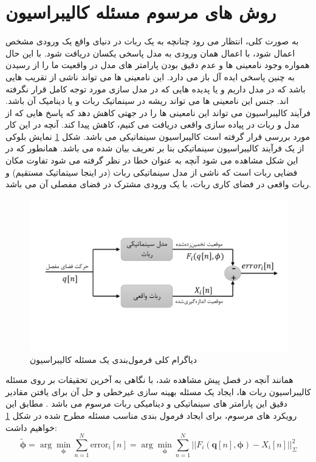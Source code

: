 \section{روش های مرسوم مسئله کالیبراسیون} \label{seq:conventional_calibration}
به صورت کلی، انتظار می رود چنانچه به یک ربات در دنیای واقع یک ورودی مشخص اعمال شود، با اعمال همان ورودی به مدل پاسخی یکسان دریافت شود. با این حال همواره وجود نامعینی ها و عدم دقیق بودن پارامتر های مدل در واقعیت ما را از رسیدن به چنین پاسخی ایده آل باز می دارد. این نامعینی ها می تواند ناشی از تقریب هایی باشد که در مدل داریم و یا پدیده هایی که در مدل سازی مورد توجه کامل قرار نگرفته اند. جنس این نامعینی ها می تواند ریشه در سینماتیک ربات و یا دینامیک آن باشد. فرآیند کالیبراسیون می تواند این نامعینی ها را در جهتی کاهش دهد که پاسخ هایی که از مدل و ربات در پیاده سازی واقعی دریافت می کنیم، کاهش پیدا کند. آنچه در این کار مورد بررسی قرار گرفته است کالیبراسیون سینماتیکی می باشد. شکل \ref{fig:kinematicmodelerror} نمایش بلوکی از یک فرآیند کالیبراسیون سینماتیکی بنا بر تعریف بیان شده می باشد. همانطور که در این شکل مشاهده می شود آنچه به عنوان خطا در نظر گرفته می شود تفاوت مکان فضایی ربات است که ناشی از مدل سینماتیکی ربات (در اینجا سیتماتیک مستقیم) و ربات واقعی در فضای کاری ربات، با یک ورودی مشترک در فضای مفصلی آن می باشد. 

\begin{figure}[!t]
	\centering
	\includegraphics[width=0.8\linewidth, trim={0cm 2.2cm 0cm 2.2cm}, clip]{img/kinematic_model_error}
	\caption{دیاگرام کلی فرمول‌بندی یک مسئله کالیبراسیون}
	\label{fig:kinematicmodelerror}
\end{figure}


همانند آنچه در فصل پیش‌ مشاهده شد، با نگاهی به آخرین تحقیقات بر روی مسئله کالیبراسیون ربات ها، ایجاد یک مسئله بهینه سازی غیرخطی و حل آن برای یافتن مقادیر دقیق این پارامتر های سینماتیکی و دینامیکی ربات مرسوم می باشد
\cite{elatta2004overview,ida2019automatic,ida2022identification,ida2021dynamics}.
مطابق این رویکرد های مرسوم، برای ایجاد فرمول بندی مناسب مسئله مطرح شده در شکل \ref{fig:kinematicmodelerror} خواهیم داشت:
\begin{equation}\label{eq:optimization_equation_conventional}
	\tilde{\boldsymbol{\phi}} =  \arg\min_{\boldsymbol{\phi}} \sum_{n = 1 }^{N} \text{error}_i[n] = \arg\min_{\boldsymbol{\phi}} \sum_{n = 1}^{N} ||F_i(\boldsymbol{q}[n], \boldsymbol{\phi}) - X_i[n]||^2_{\Sigma}
\end{equation}

